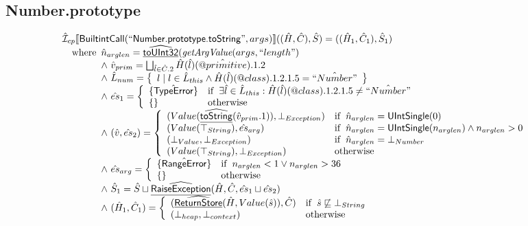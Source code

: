 \subsection{Number.prototype}
\[
\begin{array}{l}
\hat{\mathcal{I}} _{cp}\llbracket \mbox{\textsf{BuiltintCall}}(``\mbox{\textsf{Number.prototype.toString}}",args)\rrbracket((\hat{H},\hat{C}), \hat{S})
  = ((\hat{H}_1, \hat{C}_1), \hat{S}_1)\\
\quad{\rm where}\begin{array}[t]{l}
  \hat{n}_{arglen} = \widehat{\underline{\sf toUInt32}}(\emph{getArgValue}(args, ``length")\\
  \land\ \hat{v}_{prim} = \bigsqcup_{\hat{l} \in \hat{C}.2} \hat{H}(\hat{l})(\hat{@primitive}).1.2\\
  \land\ \hat{L}_{num} = 
    \left\{\begin{array}{l} l \mid l \in \hat{L}_{this} \land  \hat{H}(\hat{l})(@class).1.2.1.5 = \hat{``Number"}\end{array}\right\}\\
  \land\ \hat{es}_1 = \left\{\begin{array}{ll}
      \{\hat{\mbox{\textsf{TypeError}}}\} 
      & {\rm if}\begin{array}[t]{l}\exists \hat{l} \in \hat{L}_{this}:
          \hat{H}(\hat{l})(@class).1.2.1.5 \neq \hat{``Number"}\end{array}\\
      \left\{\begin{array}{l}\end{array}\right\} & {\rm otherwise}
    \end{array}\right.\\
  \land\ (\hat{v}, \hat{es}_2) = \left\{\begin{array}{ll}
      (Value(\widehat{\underline{\sf toString}}(\hat{v}_{prim}.1)), \bot_{Exception})
      & {\rm if}\begin{array}[t]{l}\hat{n}_{arglen} = \mbox{\textsf{UIntSingle}}(0)\end{array}\\
      (Value(\top_{String}), \hat{es}_{arg})
      & {\rm if}\begin{array}[t]{l}\hat{n}_{arglen} = \mbox{\textsf{UIntSingle}}(n_{arglen}) \land n_{arglen} > 0\end{array}\\
      (\bot_{Value}, \bot_{Exception}) & {\rm if}\begin{array}[t]{l}\hat{n}_{arglen} = \bot_{Number}\end{array}\\
      (Value(\top_{String}), \bot_{Exception}) & {\rm otherwise}
    \end{array}\right.\\
  \land\ \hat{es}_{arg} = \left\{\begin{array}{ll}
      \{\hat{\mbox{\textsf{RangeError}}}\} 
      & {\rm if}\begin{array}[t]{l}n_{arglen} < 1 \lor n_{arglen} > 36\end{array}\\
      \left\{\begin{array}{l}\end{array}\right\} & {\rm otherwise}
    \end{array}\right.\\
  \land\ \hat{S}_1 = \hat{S} \sqcup \widehat{\underline{\sf RaiseException}}(\hat{H}, \hat{C}, \hat{es}_1 \sqcup \hat{es}_2)\\
  \land\ (\hat{H}_1, \hat{C}_1) = 
    \left\{\begin{array}{ll}
      (\widehat{\underline{\sf ReturnStore}}(\hat{H}, Value(\hat{s})), \hat{C})
      & {\rm if}\begin{array}[t]{l}\hat{s} \not\sqsubseteq \bot_{String}\end{array}\\
      (\bot_{heap}, \bot_{context}) & {\rm otherwise} \\
    \end{array}\right.\\
  \end{array}\\
\\\\



\end{array}\]

